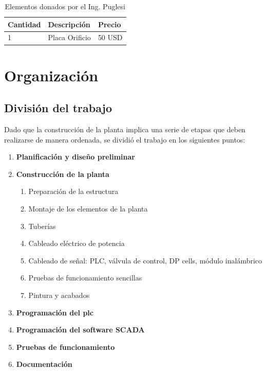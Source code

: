 \begin{table}[!t]
\renewcommand{\arraystretch}{1.4}
\centering
\begin{tabularx}{\textwidth}{l||X||l}
\hline
\bfseries Cantidad & \bfseries Descripción & \bfseries Precio\\
\hline \hline
1& Placa Orificio& 50 USD\\
\hline
\end{tabularx}
\caption{Elementos donados por el Ing. Puglesi}
\label{tab:donacionPuglesi}
\end{table}

\section{Organización}
\label{sec:Organizacion}
\subsection{División del trabajo}
Dado que la construcción de la planta implica una serie de etapas que
deben realizarse de manera ordenada, se dividió el trabajo en los siguientes
puntos:
\begin{enumerate}
 \item \textbf{Planificación y diseño preliminar}
  \item \textbf{Construcción de la planta}
  \begin{enumerate}
   \item Preparación de la estructura
   \item Montaje de los elementos de la planta
   \item Tuberías
   \item Cableado eléctrico de potencia
   \item Cableado de señal: PLC, válvula de control, DP cells, módulo
inalámbrico
   \item Pruebas de funcionamiento sencillas
   \item Pintura y acabados
  \end{enumerate}
  \item \textbf{Programación del \gls{plc}}
  \item \textbf{Programación del software SCADA}
  \item \textbf{Pruebas de funcionamiento}
  \item \textbf{Documentación}
\end{enumerate}

